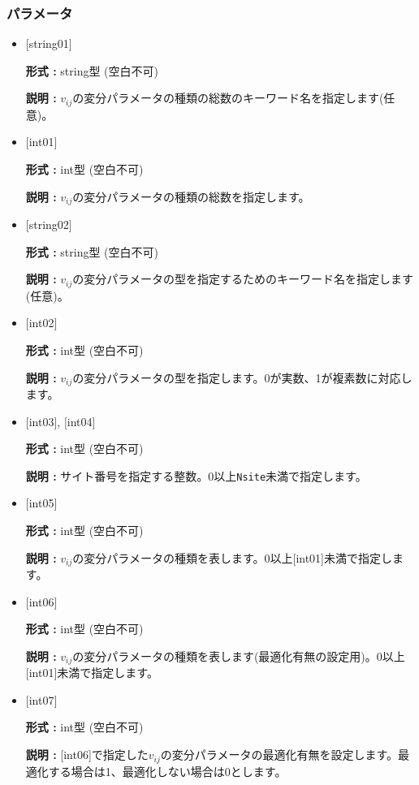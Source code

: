 \subsubsection{パラメータ}
 \begin{itemize}

   \item  $[$string01$]$
   
    {\bf 形式 :} string型 (空白不可)

   {\bf 説明 :} $v_{ij}$の変分パラメータの種類の総数のキーワード名を指定します(任意)。

   \item  $[$int01$]$
   
    {\bf 形式 :} int型 (空白不可)

   {\bf 説明 :} $v_{ij}$の変分パラメータの種類の総数を指定します。

   \item  $[$string02$]$
   
    {\bf 形式 :} string型 (空白不可)

   {\bf 説明 :} $v_{ij}$の変分パラメータの型を指定するためのキーワード名を指定します(任意)。

   \item  $[$int02$]$
   
    {\bf 形式 :} int型 (空白不可)

   {\bf 説明 :} $v_{ij}$の変分パラメータの型を指定します。0が実数、1が複素数に対応します。

  \item  $[$int03$]$, $[$int04$]$
  
 {\bf 形式 :} int型 (空白不可)

{\bf 説明 :} サイト番号を指定する整数。0以上\verb|Nsite|{未満}で指定します。
 
 \item  $[$int05$]$
   
   {\bf 形式 :} int型 (空白不可)

  {\bf 説明 :} $v_{ij}$の変分パラメータの種類を表します。0以上[int01]{未満}で指定します。

 \item  $[$int06$]$
   
   {\bf 形式 :} int型 (空白不可)

  {\bf 説明 :} $v_{ij}$の変分パラメータの種類を表します(最適化有無の設定用)。0以上[int01]{未満}で指定します。

 \item  $[$int07$]$
   
   {\bf 形式 :} int型 (空白不可)

  {\bf 説明 :} [int06]で指定した$v_{ij}$の変分パラメータの最適化有無を設定します。最適化する場合は1、最適化しない場合は0とします。
  
\end{itemize}

